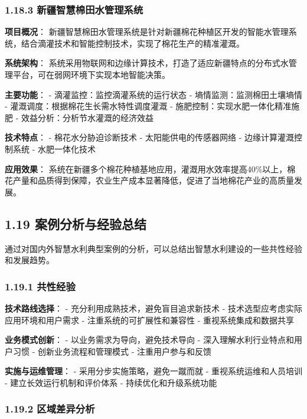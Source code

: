\subsubsection{1.18.3
新疆智慧棉田水管理系统}\label{ux65b0ux7586ux667aux6167ux68c9ux7530ux6c34ux7ba1ux7406ux7cfbux7edf}

\textbf{项目概况}：
新疆智慧棉田水管理系统是针对新疆棉花种植区开发的智能水管理系统，结合滴灌技术和智能控制技术，实现了棉花生产的精准灌溉。

\textbf{系统架构}：
系统采用物联网和边缘计算技术，打造了适应新疆特点的分布式水管理平台，可在弱网环境下实现本地智能决策。

\textbf{主要功能}： - 滴灌监控：监控滴灌系统的运行状态 -
墒情监测：监测棉田土壤墒情 - 灌溉调度：根据棉花生长需水特性调度灌溉 -
施肥控制：实现水肥一体化精准施肥 - 效益分析：分析节水灌溉的经济效益

\textbf{技术特点}： - 棉花水分胁迫诊断技术 - 太阳能供电的传感器网络 -
边缘计算灌溉控制系统 - 水肥一体化技术

\textbf{应用效果}：
系统在新疆多个棉花种植基地应用，灌溉用水效率提高40\%以上，棉花产量和品质得到保障，农业生产成本显著降低，促进了当地棉花产业的高质量发展。

\subsection{1.19
案例分析与经验总结}\label{ux6848ux4f8bux5206ux6790ux4e0eux7ecfux9a8cux603bux7ed3}

通过对国内外智慧水利典型案例的分析，可以总结出智慧水利建设的一些共性经验和发展趋势。

\subsubsection{1.19.1 共性经验}\label{ux5171ux6027ux7ecfux9a8c}

\textbf{技术路线选择}： - 充分利用成熟技术，避免盲目追求新技术 -
技术选型应考虑实际应用环境和用户需求 - 注重系统的可扩展性和兼容性 -
重视系统集成和数据共享

\textbf{业务模式创新}： - 以业务需求为导向，避免技术导向 -
深入理解水利行业特点和用户习惯 - 创新业务流程和管理模式 -
注重用户参与和反馈

\textbf{实施与运维管理}： - 采用分步实施策略，避免一蹴而就 -
重视系统运维和人员培训 - 建立长效运行机制和评价体系 -
持续优化和升级系统功能

\subsubsection{1.19.2
区域差异分析}\label{ux533aux57dfux5deeux5f02ux5206ux6790}

